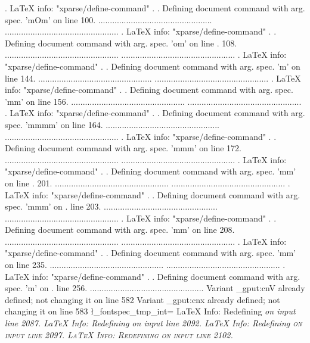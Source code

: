 . LaTeX info: "xparse/define-command"
. 
. Defining document command \newfontface with arg. spec. 'mO{}m' on line 100.
.................................................
.................................................
. LaTeX info: "xparse/define-command"
. 
. Defining document command  with arg. spec. 'om' on line
. 108.
.................................................
.................................................
. LaTeX info: "xparse/define-command"
. 
. Defining document command \addfontfeatures with arg. spec. 'm' on line 144.
.................................................
.................................................
. LaTeX info: "xparse/define-command"
. 
. Defining document command \newfontfeature with arg. spec. 'mm' on line 156.
.................................................
.................................................
. LaTeX info: "xparse/define-command"
. 
. Defining document command \newAATfeature with arg. spec. 'mmmm' on line 164.
.................................................
.................................................
. LaTeX info: "xparse/define-command"
. 
. Defining document command \newICUfeature with arg. spec. 'mmm' on line 172.
.................................................
.................................................
. LaTeX info: "xparse/define-command"
. 
. Defining document command \aliasfontfeature with arg. spec. 'mm' on line
. 201.
.................................................
.................................................
. LaTeX info: "xparse/define-command"
. 
. Defining document command \aliasfontfeatureoption with arg. spec. 'mmm' on
. line 203.
.................................................
.................................................
. LaTeX info: "xparse/define-command"
. 
. Defining document command \newfontscript with arg. spec. 'mm' on line 208.
.................................................
.................................................
. LaTeX info: "xparse/define-command"
. 
. Defining document command \newfontlanguage with arg. spec. 'mm' on line 235.
.................................................
.................................................
. LaTeX info: "xparse/define-command"
. 
. Defining document command \DeclareFontsExtensions with arg. spec. 'm' on
. line 256.
.................................................
Variant \prop_gput:cnV already defined; not changing it on line 582
Variant \prop_gput:cnx already defined; not changing it on line 583
\l_fontspec_tmp_int=
LaTeX Info: Redefining \itshape on input line 2087.
LaTeX Info: Redefining \slshape on input line 2092.
LaTeX Info: Redefining \scshape on input line 2097.
LaTeX Info: Redefining \upshape on input line 2102.

